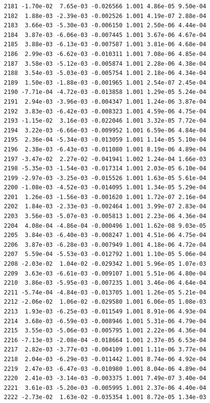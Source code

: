 \documentclass[
  letterpaper,
  DIV=11,
  numbers=noendperiod]{scrartcl}
\begin{document}
\begin{verbatim}
2181 -1.70e-02  7.65e-03 -0.026566 1.001 4.86e-05 9.50e-04    
2182  1.88e-03 -2.39e-03 -0.002526 1.001 4.19e-07 2.88e-04    
2183  3.66e-03 -5.30e-03 -0.006150 1.001 2.50e-06 4.44e-04    
2184  3.87e-03 -6.06e-03 -0.007445 1.001 3.67e-06 4.67e-04    
2185  3.88e-03 -6.13e-03 -0.007587 1.001 3.81e-06 4.68e-04    
2186  2.99e-03 -6.62e-03 -0.010311 1.001 7.08e-06 4.85e-04    
2187  3.58e-03 -5.12e-03 -0.005874 1.001 2.28e-06 4.38e-04    
2188  3.54e-03 -5.03e-03 -0.005754 1.001 2.18e-06 4.34e-04    
2189  1.50e-03 -1.88e-03 -0.001965 1.001 2.54e-07 2.45e-04    
2190 -7.71e-04 -4.72e-03 -0.013858 1.001 1.29e-05 5.24e-04    
2191  2.94e-03 -3.96e-03 -0.004347 1.001 1.24e-06 3.87e-04    
2192  3.83e-03 -6.42e-03 -0.008323 1.001 4.59e-06 4.75e-04    
2193 -1.15e-02  3.16e-03 -0.022046 1.001 3.32e-05 7.72e-04    
2194  3.22e-03 -6.66e-03 -0.009952 1.001 6.59e-06 4.84e-04    
2195  2.36e-04 -5.34e-03 -0.013059 1.001 1.14e-05 5.10e-04    
2196  2.38e-03 -6.43e-03 -0.011080 1.001 8.19e-06 4.89e-04    
2197 -3.47e-02  2.27e-02 -0.041941 1.002 1.24e-04 1.66e-03    
2198 -5.35e-03 -1.54e-03 -0.017314 1.001 2.03e-05 6.10e-04    
2199 -2.97e-03 -3.25e-03 -0.015526 1.001 1.63e-05 5.61e-04    
2200 -1.08e-03 -4.52e-03 -0.014095 1.001 1.34e-05 5.29e-04    
2201  1.26e-03 -1.56e-03 -0.001620 1.001 1.72e-07 2.16e-04    
2202  1.84e-03 -2.33e-03 -0.002464 1.001 3.99e-07 2.83e-04    
2203  3.56e-03 -5.07e-03 -0.005813 1.001 2.23e-06 4.36e-04    
2204  4.08e-04 -4.86e-04 -0.000496 1.001 1.62e-08 9.03e-05    
2205  3.84e-03 -6.40e-03 -0.008247 1.001 4.51e-06 4.75e-04    
2206  3.87e-03 -6.28e-03 -0.007949 1.001 4.18e-06 4.72e-04    
2207  5.59e-04 -5.53e-03 -0.012792 1.001 1.10e-05 5.06e-04    
2208 -2.03e-02  1.04e-02 -0.029342 1.001 5.96e-05 1.07e-03    
2209  3.63e-03 -6.61e-03 -0.009107 1.001 5.51e-06 4.80e-04    
2210  3.86e-03 -5.95e-03 -0.007235 1.001 3.46e-06 4.64e-04    
2211 -5.74e-04 -4.84e-03 -0.013705 1.001 1.26e-05 5.21e-04    
2212 -2.06e-02  1.06e-02 -0.029580 1.001 6.06e-05 1.08e-03    
2213  1.93e-03 -6.25e-03 -0.011549 1.001 8.91e-06 4.93e-04    
2214  3.68e-03 -6.59e-03 -0.008946 1.001 5.31e-06 4.79e-04    
2215  3.55e-03 -5.06e-03 -0.005795 1.001 2.22e-06 4.36e-04    
2216 -7.13e-03 -2.08e-04 -0.018664 1.001 2.37e-05 6.53e-04    
2217  2.82e-03 -3.77e-03 -0.004109 1.001 1.11e-06 3.77e-04    
2218  2.04e-03 -6.29e-03 -0.011442 1.001 8.74e-06 4.92e-04    
2219  2.47e-03 -6.47e-03 -0.010980 1.001 8.04e-06 4.89e-04    
2220  2.41e-03 -3.14e-03 -0.003375 1.001 7.49e-07 3.40e-04    
2221  3.61e-03 -5.20e-03 -0.005995 1.001 2.37e-06 4.40e-04    
2222 -2.73e-02  1.63e-02 -0.035354 1.001 8.72e-05 1.34e-03    

\end{verbatim}
\end{document}
